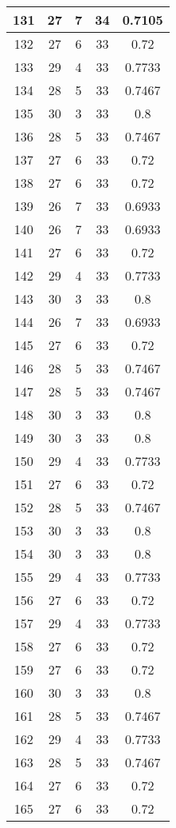 \documentclass[letterpaper, 12pt]{article}
\begin{document}
\begin{longtable}{|c|c|c|c|c|}
\hline
131 & 27 & 7 & 34 & 0.7105 \\
\hline
132 & 27 & 6 & 33 & 0.72 \\
\hline
133 & 29 & 4 & 33 & 0.7733 \\
\hline
134 & 28 & 5 & 33 & 0.7467 \\
\hline
135 & 30 & 3 & 33 & 0.8 \\
\hline
136 & 28 & 5 & 33 & 0.7467 \\
\hline
137 & 27 & 6 & 33 & 0.72 \\
\hline
138 & 27 & 6 & 33 & 0.72 \\
\hline
139 & 26 & 7 & 33 & 0.6933 \\
\hline
140 & 26 & 7 & 33 & 0.6933 \\
\hline
141 & 27 & 6 & 33 & 0.72 \\
\hline
142 & 29 & 4 & 33 & 0.7733 \\
\hline
143 & 30 & 3 & 33 & 0.8 \\
\hline
144 & 26 & 7 & 33 & 0.6933 \\
\hline
145 & 27 & 6 & 33 & 0.72 \\
\hline
146 & 28 & 5 & 33 & 0.7467 \\
\hline
147 & 28 & 5 & 33 & 0.7467 \\
\hline
148 & 30 & 3 & 33 & 0.8 \\
\hline
149 & 30 & 3 & 33 & 0.8 \\
\hline
150 & 29 & 4 & 33 & 0.7733 \\
\hline
151 & 27 & 6 & 33 & 0.72 \\
\hline
152 & 28 & 5 & 33 & 0.7467 \\
\hline
153 & 30 & 3 & 33 & 0.8 \\
\hline
154 & 30 & 3 & 33 & 0.8 \\
\hline
155 & 29 & 4 & 33 & 0.7733 \\
\hline
156 & 27 & 6 & 33 & 0.72 \\
\hline
157 & 29 & 4 & 33 & 0.7733 \\
\hline
158 & 27 & 6 & 33 & 0.72 \\
\hline
159 & 27 & 6 & 33 & 0.72 \\
\hline
160 & 30 & 3 & 33 & 0.8 \\
\hline
161 & 28 & 5 & 33 & 0.7467 \\
\hline
162 & 29 & 4 & 33 & 0.7733 \\
\hline
163 & 28 & 5 & 33 & 0.7467 \\
\hline
164 & 27 & 6 & 33 & 0.72 \\
\hline
165 & 27 & 6 & 33 & 0.72 \\

\end{longtable}
\end{document}

